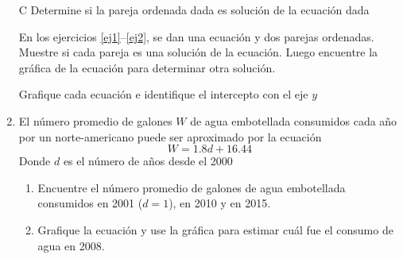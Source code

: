 \documentclass[10pt,twoside]{article}
\begin{document}
\begin{enumerate}
\begin{minipage}{.5\textwidth}
\end{minipage}
\item[C] Determine si la pareja ordenada dada es solución de la ecuación dada
En los ejercicios \ref{ej1}--\ref{ej2}, se dan una ecuación y dos parejas ordenadas. Muestre si cada pareja es una solución de la ecuación. Luego encuentre la gráfica de la ecuación para determinar otra solución.
Grafique cada ecuación e identifique el intercepto con el eje $y$
\item El número promedio de galones $W$ de agua embotellada consumidos cada año por un norte-americano puede ser aproximado por la ecuación
\[W=1.8d+16.44\]
Donde $d$ es el número de años desde el 2000
\begin{enumerate}
\item Encuentre el número promedio de galones de agua embotellada consumidos en 2001 ($d=1$), en 2010 y en 2015.
\item Grafique la ecuación y use la gráfica para estimar cuál fue el consumo de agua en 2008.

\end{enumerate}
\end{enumerate}
\end{document}
